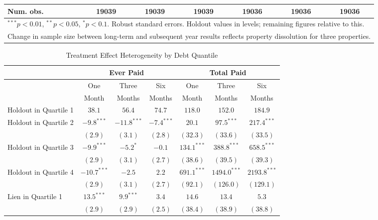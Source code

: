 \begin{table}[htbp]
\begin{center}
\begin{tabular}{l c c c c c c }
\hline
Num. obs.    & 19039        & 19039        & 19039         & 19036        & 19036        & 19036          \\
\hline
\multicolumn{7}{l}{\scriptsize{$^{***}p<0.01$, $^{**}p<0.05$, $^*p<0.1$. Robust standard errors. Holdout values in levels; remaining figures relative to this.}} \\
\multicolumn{7}{l}{\scriptsize{Change in sample size between long-term and subsequent year results reflects property dissolution for three properties.}}
\end{tabular}
\label{ltmpme}
\end{center}
\end{table}

\begin{table}[htbp]
\caption{Treatment Effect Heterogeneity by Debt Quantile}
\begin{center}
\begin{tabular}{l c c c c c c }
\hline
 & \multicolumn{3}{c}{Ever Paid} & \multicolumn{3}{c}{Total Paid} \\
\hline
 & One & Three & Six & One & Three & Six \\
 & Month & Months & Months & Month & Months & Months \\
\hline
Holdout in Quartile 1 & $38.1$  & $56.4$  & $74.7$ & $118.0$ & $152.0$  & $184.9$  \\
\hline
Holdout in Quartile 2 & $-9.8^{***}$  & $-11.8^{***}$ & $-7.4^{***}$ & $20.1$        & $97.5^{***}$   & $217.4^{***}$  \\
                      & $(2.9)$       & $(3.1)$       & $(2.8)$      & $(32.3)$      & $(33.6)$       & $(33.5)$       \\
Holdout in Quartile 3 & $-9.9^{***}$  & $-5.2^{*}$    & $-0.1$       & $134.1^{***}$ & $388.8^{***}$  & $658.5^{***}$  \\
                      & $(2.9)$       & $(3.1)$       & $(2.7)$      & $(38.6)$      & $(39.5)$       & $(39.3)$       \\
Holdout in Quartile 4 & $-10.7^{***}$ & $-2.5$        & $2.2$        & $691.1^{***}$ & $1494.0^{***}$ & $2193.8^{***}$ \\
                      & $(2.9)$       & $(3.1)$       & $(2.7)$      & $(92.1)$      & $(126.0)$      & $(129.1)$      \\
Lien in Quartile 1    & $13.5^{***}$  & $9.9^{***}$   & $3.4$        & $14.6$        & $13.4$         & $5.3$          \\
                      & $(2.9)$       & $(2.9)$       & $(2.5)$      & $(38.4)$      & $(38.9)$       & $(38.8)$       \\

\end{tabular}
\end{center}
\end{table}
